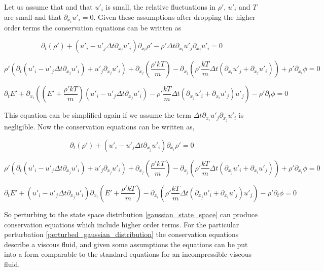 \documentclass[%
 twocolumn,
 amsmath,amssymb,
 aps,
]{revtex4-1}
\begin{document}
\begin{widetext}
Let us assume that and that $u'_i$ is small, the relative fluctuations in $\rho'$, $u'_i$ and $T$ are small and that $\partial_{x_i}u'_i=0$. Given these assumptions after dropping the higher order terms the conservation equations can be written as

\[
\partial_t\left(\rho'\right) + \left(u'_i - u'_j\Delta t\partial_{x_j}u'_i\right)\partial_{x_i}\rho' - \rho'\Delta t\partial_{x_i}u'_j\partial_{x_j}u'_i=0
\]

\[
\rho'\left(\partial_t\left(u'_i - u'_j\Delta t\partial_{x_j}u'_i\right) + u'_j\partial_{x_j}u'_i\right) + \partial_{x_j}\left(\frac{\rho'kT}{m}\right) - \partial_{x_j}\left(\rho'\frac{kT}{m}\Delta t\left(\partial_{x_i}u'_j + \partial_{x_j}u'_i\right)\right) + \rho'\partial_{x_i}\phi = 0
\]

\[
\partial_t E' + \partial_{x_i}\left(\left(E' + \frac{\rho'kT}{m}\right)\left(u'_i - u'_j\Delta t\partial_{x_j}u'_i\right) - \rho'\frac{kT}{m}\Delta t\left(\partial_{x_j}u'_i + \partial_{x_i}u'_j\right)u'_j\right)-\rho'\partial_t\phi = 0
\]

This equation can be simplified again if we assume the term $\Delta t\partial_{x_i}u'_j\partial_{x_j}u'_i$ is negligible. Now the conservation equations can be written as,

\[
\partial_t\left(\rho'\right) + \left(u'_i - u'_j\Delta t\partial_{x_j}u'_i\right)\partial_{x_i}\rho'=0
\]

\[
\rho'\left(\partial_t\left(u'_i - u'_j\Delta t\partial_{x_j}u'_i\right) + u'_j\partial_{x_j}u'_i\right) + \partial_{x_j}\left(\frac{\rho'kT}{m}\right) - \partial_{x_j}\left(\rho'\frac{kT}{m}\Delta t\left(\partial_{x_j}u'_i + \partial_{x_i}u'_j\right)\right) + \rho'\partial_{x_i}\phi = 0
\]

\[
\partial_t E' + \left(u'_i - u'_j\Delta t\partial_{x_j}u'_i\right)\partial_{x_i}\left(E' + \frac{\rho'kT}{m}\right) - \partial_{x_i}\left(\rho'\frac{kT}{m}\Delta t\left(\partial_{x_j}u'_i + \partial_{x_i}u'_j\right)u'_j\right) - \rho'\partial_t\phi = 0
\]

So perturbing to the state space distribution \eqref{gaussian_state_space} can produce conservation equations which include higher order terms. For the particular perturbation \eqref{perturbed_gaussian_distribution} the conservation equations describe a viscous fluid, and given some assumptions the equations can be put into a form comparable to the standard equations for an incompressible viscous fluid.
\end{widetext}
\end{document}
